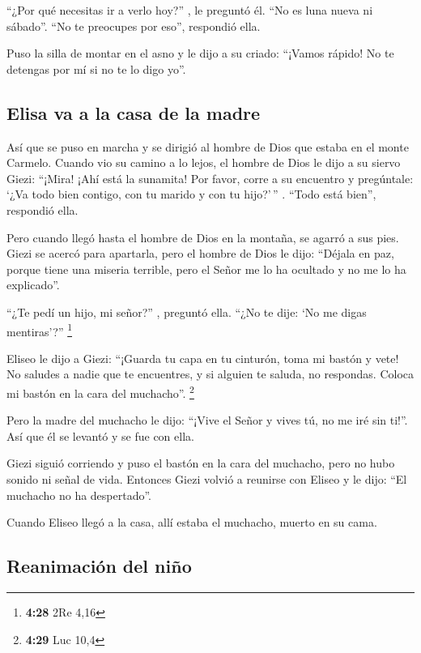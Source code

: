  ``¿Por qué necesitas ir a verlo hoy?'' , le preguntó él.
``No es luna nueva ni sábado''. ``No te preocupes por eso'', respondió
ella.

 Puso la silla de montar en el asno y le dijo a su
criado: ``¡Vamos rápido! No te detengas por mí si no te lo digo yo''.

\hypertarget{elisa-va-a-la-casa-de-la-madre}{%
\subsection{Elisa va a la casa de la
madre}\label{elisa-va-a-la-casa-de-la-madre}}

 Así que se puso en marcha y se dirigió al hombre de Dios
que estaba en el monte Carmelo. Cuando vio su camino a lo lejos, el
hombre de Dios le dijo a su siervo Giezi: ``¡Mira! ¡Ahí está la
sunamita!  Por favor, corre a su encuentro y pregúntale:
`¿Va todo bien contigo, con tu marido y con tu hijo?'\,'' . ``Todo está
bien'', respondió ella.

 Pero cuando llegó hasta el hombre de Dios en la montaña,
se agarró a sus pies. Giezi se acercó para apartarla, pero el hombre de
Dios le dijo: ``Déjala en paz, porque tiene una miseria terrible, pero
el Señor me lo ha ocultado y no me lo ha explicado''.

 ``¿Te pedí un hijo, mi señor?'' , preguntó ella. ``¿No
te dije: `No me digas mentiras'?'' \footnote{\textbf{4:28} 2Re 4,16}

 Eliseo le dijo a Giezi: ``¡Guarda tu capa en tu
cinturón, toma mi bastón y vete! No saludes a nadie que te encuentres, y
si alguien te saluda, no respondas. Coloca mi bastón en la cara del
muchacho''. \footnote{\textbf{4:29} Luc 10,4}

 Pero la madre del muchacho le dijo: ``¡Vive el Señor y
vives tú, no me iré sin ti!''. Así que él se levantó y se fue con ella.

 Giezi siguió corriendo y puso el bastón en la cara del
muchacho, pero no hubo sonido ni señal de vida. Entonces Giezi volvió a
reunirse con Eliseo y le dijo: ``El muchacho no ha despertado''.

 Cuando Eliseo llegó a la casa, allí estaba el muchacho,
muerto en su cama.

\hypertarget{reanimaciuxf3n-del-niuxf1o}{%
\subsection{Reanimación del niño}\label{reanimaciuxf3n-del-niuxf1o}}

